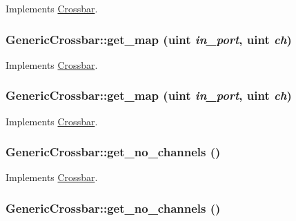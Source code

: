 Implements \hyperlink{classCrossbar_8a7a059788ee336f171eb1d3c7be3110}{Crossbar}.\hypertarget{classGenericCrossbar_65b435392191561b7a4759e20aacab4e}{
\subsubsection[{get\_\-map}]{ GenericCrossbar::get\_\-map ({\bf uint} {\em in\_\-port}, \/  {\bf uint} {\em ch})}}
\label{classGenericCrossbar_65b435392191561b7a4759e20aacab4e}




Implements \hyperlink{classCrossbar_b7a6eee3263359c40f24dde01decfa20}{Crossbar}.\hypertarget{classGenericCrossbar_65b435392191561b7a4759e20aacab4e}{
\subsubsection[{get\_\-map}]{ GenericCrossbar::get\_\-map ({\bf uint} {\em in\_\-port}, \/  {\bf uint} {\em ch})}}
\label{classGenericCrossbar_65b435392191561b7a4759e20aacab4e}




Implements \hyperlink{classCrossbar_b7a6eee3263359c40f24dde01decfa20}{Crossbar}.\hypertarget{classGenericCrossbar_945a3d32809787bd2c5ee68714467467}{
\subsubsection[{get\_\-no\_\-channels}]{ GenericCrossbar::get\_\-no\_\-channels ()}}
\label{classGenericCrossbar_945a3d32809787bd2c5ee68714467467}




Implements \hyperlink{classCrossbar_a8e1c2a18960f4e6b9c076246239b092}{Crossbar}.\hypertarget{classGenericCrossbar_945a3d32809787bd2c5ee68714467467}{
\subsubsection[{get\_\-no\_\-channels}]{ GenericCrossbar::get\_\-no\_\-channels ()}}
\label{classGenericCrossbar_945a3d32809787bd2c5ee68714467467}




